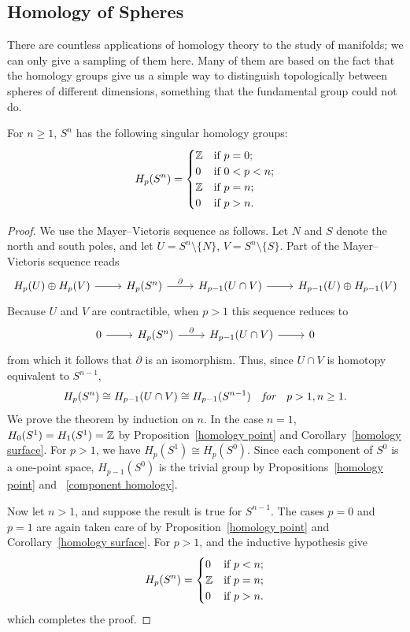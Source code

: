 \subsection{Homology of Spheres}
There are countless applications of homology theory to the study of manifolds; we can only give a sampling of them here. Many of them are based on the fact that the
homology groups give us a simple way to distinguish topologically between spheres of different dimensions, something that the fundamental group could not do.
\begin{theorem}\label{homology sphere}
For $n\geq1$, $S^n$ has the following singular homology groups:
\[H_p(S^n)=\begin{cases}
\mathbb{Z}&\text{if }p=0;\\
0&\text{if }0<p<n;\\
\mathbb{Z}&\text{if }p=n;\\
0&\text{if }p>n.
\end{cases}\]
\end{theorem}
\begin{proof}
We use the Mayer–Vietoris sequence as follows. Let $N$ and $S$ denote the north and south poles, and let $U=S^n\setminus\{N\}$, $V=S^n\setminus\{S\}$. Part of the Mayer–Vietoris sequence reads
\[\begin{tikzcd}
H_p(U)\oplus H_p(V)\ar[r]&H_p(S^n)\ar[r,"\partial"]&H_{p-1}(U\cap V)\ar[r]&H_{p-1}(U)\oplus H_{p-1}(V)
\end{tikzcd}\]
Because $U$ and $V$ are contractible, when $p>1$ this sequence reduces to
\[\begin{tikzcd}
0\ar[r]&H_p(S^n)\ar[r,"\partial"]&H_{p-1}(U\cap V)\ar[r]&0
\end{tikzcd}\]
from which it follows that $\partial$ is an isomorphism. Thus, since $U\cap V$ is homotopy equivalent to $S^{n-1}$, 
\[H_p(S^n)\cong H_{p-1}(U\cap V)\cong H_{p-1}(S^{n-1})\quad\textit{for}\quad p>1,n\geq 1.\]
We prove the theorem by induction on $n$. In the case $n=1$, $H_0(S^1)=H_1(S^1)=\mathbb{Z}$ by Proposition~\ref{homology point} and Corollary~\ref{homology surface}. For $p>1$, we have $H_p(S^1)\cong H_p(S^0)$. Since each component of $S^0$ is a one-point space, $H_{p-1}(S^0)$ is the trivial group by Propositions~\ref{homology point} and ~\ref{component homology}.\par
Now let $n>1$, and suppose the result is true for $S^{n-1}$. The cases $p=0$ and
$p=1$ are again taken care of by Proposition~\ref{homology point} and Corollary~\ref{homology surface}. For $p>1$, and the inductive hypothesis give
\[H_p(S^n)=\begin{cases}
0&\text{if }p<n;\\
\mathbb{Z}&\text{if }p=n;\\
0&\text{if }p>n.
\end{cases}\]
which completes the proof.
\end{proof}
